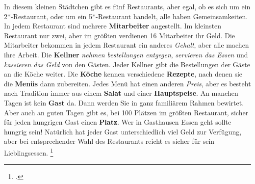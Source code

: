 \documentclass{bschlangaul-aufgabe}
\begin{document}


In diesem kleinen Städtchen gibt es fünf Restaurants, aber egal, ob es
sich um ein 2*-Restaurant, oder um ein 5*-Restaurant handelt, alle haben
Gemeinsamkeiten. In jedem Restaurant sind mehrere \textbf{Mitarbeiter}
angestellt. Im kleinsten Restaurant nur zwei, aber im größten verdienen
16 Mitarbeiter ihr Geld. Die Mitarbeiter bekommen in jedem Restaurant
ein anderes \emph{Gehalt}, aber alle machen ihre Arbeit. Die
\textbf{Kellner}
\emph{nehmen bestellungen entgegen}, \emph{servieren das Essen} und
\emph{kassieren das Geld} von den Gästen. Jeder Kellner gibt die
Bestellungen der Gäste an die Köche weiter. Die \textbf{Köche} kennen
verschiedene \textbf{Rezepte}, nach denen sie die \textbf{Menüs} dann
zubereiten. Jedes Menü hat einen anderen \emph{Preis}, aber es besteht
nach Tradition immer aus einem \textbf{Salat} und einer
\textbf{Hauptspeise}. An manchen Tagen ist kein \textbf{Gast} da. Dann
werden Sie in ganz familiärem Rahmen bewirtet. Aber auch an guten Tagen
gibt es, bei 100 Plätzen im größten Restaurant, sicher für jeden
hungrigen Gast einen \textbf{Platz}. Wer in Gasthausen Essen geht sollte
hungrig sein! Natürlich hat jeder Gast unterschiedlich viel Geld zur
Verfügung, aber bei entsprechender Wahl des Restaurants reicht es sicher
für sein Lieblingsessen.
\footcite[Seite 4-5]{net:pdf:wikiversity:klassendiagramm}
\end{document}
